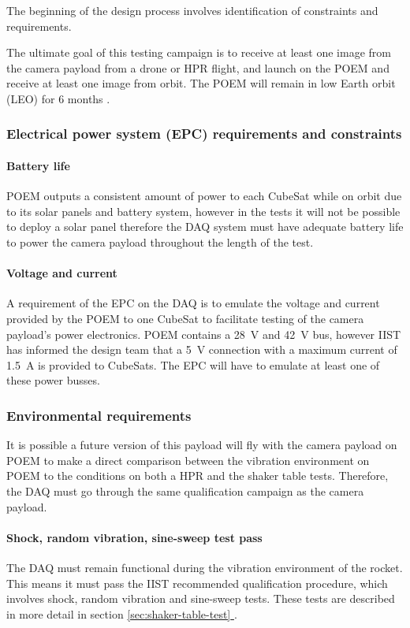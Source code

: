 \documentclass[a4paper,11pt]{article}
\newcommand*{\fullref}[1]{\hyperref[{#1}]{\ref*{#1} \nameref*{#1}}}
\begin{document}
The beginning of the design process involves identification of constraints and requirements.

The ultimate goal of this testing campaign is to receive at least one image from the camera payload from a drone or HPR flight, and launch on the POEM and receive at least one image from orbit. The POEM will remain in low Earth orbit (LEO) for 6 months \cite{jagdale2023sanket}.

\subsubsection{Electrical power system (EPC) requirements and constraints}
\paragraph{Battery life} POEM outputs a consistent amount of power to each CubeSat while on orbit due to its solar panels and battery system, however in the tests it will not be possible to deploy a solar panel therefore the DAQ system must have adequate battery life to power the camera payload throughout the length of the test.
\paragraph{Voltage and current} A requirement of the EPC on the DAQ is to emulate the voltage and current provided by the POEM to one CubeSat to facilitate testing of the camera payload's power electronics. POEM contains a \SI{28}{\volt} and \SI{42}{\volt} bus, however IIST has informed the design team that a \SI{5}{\volt} connection with a maximum current of \SI{1.5}{\ampere} is provided to CubeSats. The EPC will have to emulate at least one of these power busses.

\subsubsection{Environmental requirements}
It is possible a future version of this payload will fly with the camera payload on POEM to make a direct comparison between the vibration environment on POEM to the conditions on both a HPR and the shaker table tests. Therefore, the DAQ must go through the same qualification campaign as the camera payload.

\paragraph{Shock, random vibration, sine-sweep test pass} The DAQ must remain functional during the vibration environment of the rocket. This means it must pass the IIST recommended qualification procedure, which involves shock, random vibration and sine-sweep tests. These tests are described in more detail in section \fullref{sec:shaker-table-test}.
\end{document}
